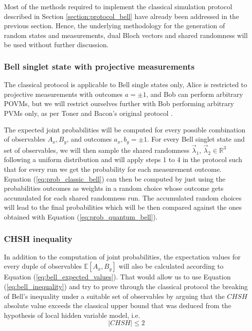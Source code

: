Most of the methods required to implement the classical simulation protocol described in Section \ref{section:protocol_bell} have already been addressed in the previous section. Hence, the underlying methodology for the generation of random states and measurements, dual Bloch vectors and shared randomness will be used without further discussion.

\subsubsection{Bell singlet state with projective measurements}

The classical protocol is applicable to Bell single states only, Alice is restricted to projective measurements with outcomes $a=\pm1$, and Bob can perform arbitrary POVMs, but we will restrict ourselves further with Bob performing arbitrary PVMs only, as per Toner and Bacon's original protocol \cite{toner2003}.

The expected joint probabilities will be computed for every possible combination of observables $A_{x}, B_{y}$, and outcomes $a_{x}, b_{y} = \pm1$. For every Bell singlet state and set of observables, we will then sample the shared randomness $\vec{\lambda}_1$, $\vec{\lambda}_2 \in \mathbb{R}^3$ following a uniform distribution and will apply steps 1 to 4 in the protocol such that for every run we get the probability for each measurement outcome. Equation (\ref{eq:prob_classic_bell}) can then be computed by just using the probabilities outcomes as weights in a random choice whose outcome gets accumulated for each shared randomness run. The accumulated random choices will lead to the final probabilities which will be then compared against the ones obtained with Equation (\ref{eq:prob_quantum_bell}).

\subsubsection{CHSH inequality}
In addition to the computation of joint probabilities, the expectation values for every duple of observables $\mathbb{E}[A_{x}, B_{y}]$ will also be calculated according to Equation (\ref{eq:bell_expected_values}). That would allow us to use Equation (\ref{eq:bell_inequality}) and try to prove through the classical protocol the breaking of Bell's inequality under a suitable set of observables by arguing that the $CHSH$ absolute value exceeds the classical upper bound that was deduced from the hypothesis of local hidden variable model, i.e.
\begin{equation}\label{eq:chsh_inequality}
|{CHSH}| \leq 2
\end{equation}